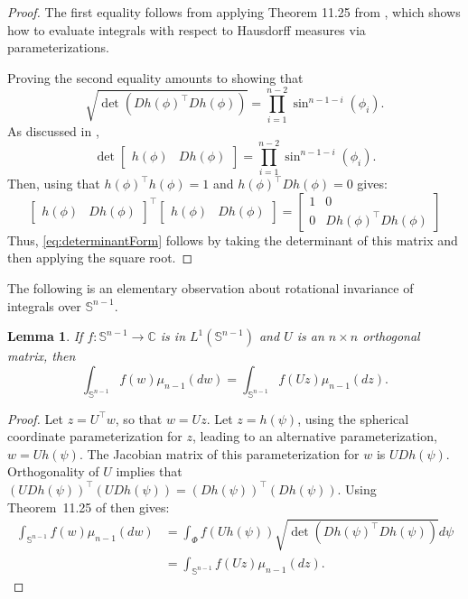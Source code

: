\documentclass[twoside]{article}
\newtheorem{lemma}{Lemma}
\theoremstyle{definition}
\renewcommand{\S}{\mathbb{S}}
\newcommand{\C}{\mathbb{C}}
\newcommand{\1}[1]{\scalebox{1.25}{$\mathds{1}$}\left[#1\right]}
\begin{document}
\begin{proof}
The first equality follows from applying Theorem 11.25 from \cite{folland1999real}, which shows how to evaluate integrals with respect to Hausdorff measures via parameterizations. 

Proving the second equality amounts to showing that 
\begin{equation}
\label{eq:determinantForm}
\sqrt{\det(Dh(\phi)^\top Dh(\phi))}=\prod_{i=1}^{n-2}\sin^{n-1-i}(\phi_i).
\end{equation}
As discussed in \cite{blumenson1960derivation}, 
$$
\det\begin{bmatrix}
h(\phi) & Dh(\phi)
\end{bmatrix}
=\prod_{i=1}^{n-2}\sin^{n-1-i}(\phi_i).
$$
Then, using that $h(\phi)^\top h(\phi)=1$ and $h(\phi)^\top Dh(\phi)=0$ gives:
\begin{equation*}
\begin{bmatrix}
h(\phi) & Dh(\phi)
\end{bmatrix}^\top \begin{bmatrix}
h(\phi) & Dh(\phi)
\end{bmatrix}=\begin{bmatrix}
1 & 0 \\
0 & Dh(\phi)^\top Dh(\phi)
\end{bmatrix}
\end{equation*}
Thus, \eqref{eq:determinantForm} follows by taking the determinant of  this matrix and then applying the square root.
\end{proof}

The following is an elementary observation about rotational invariance of integrals over $\S^{n-1}$. 

\begin{lemma}
\label{lem:rotationalInvariance}
If $f:\S^{n-1}\to \C$ is in $L^1(\S^{n-1})$ and $U$ is an $n\times n$ orthogonal matrix, then
$$
\int_{\S^{n-1}}f(w)\mu_{n-1}(dw)=\int_{\S^{n-1}}f(Uz)\mu_{n-1}(dz).
$$
\end{lemma}

\begin{proof}
Let $z = U^\top w$, so that $w=Uz$. Let $z=h(\psi)$,  using the spherical coordinate parameterization for $z$, leading to an alternative parameterization, $w=Uh(\psi)$. The Jacobian matrix of this parameterization for $w$ is $UDh(\psi)$. Orthogonality of $U$ implies that $(UDh(\psi))^\top (UDh(\psi))=(Dh(\psi))^\top (Dh(\psi))$. Using Theorem~11.25 of \cite{folland1999real} then
gives:
\begin{align*}
\int_{\S^{n-1}} f(w)\mu_{n-1}(dw)&=\int_{\Phi}f(Uh(\psi))\sqrt{\det(Dh(\psi)^\top Dh(\psi))}d\psi \\
&=\int_{\S^{n-1}}f(Uz)\mu_{n-1}(dz). 
\end{align*}
\end{proof}
\end{document}
